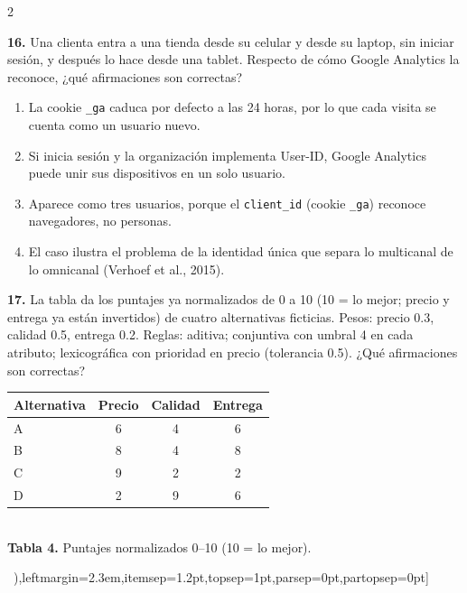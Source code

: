 \documentclass[10pt,letterpaper]{article}
\newcommand{\cas}{\framebox[1.0em]{\rule{0pt}{1.05ex}}}
\begin{document}
\begin{multicols}{2}
\begin{minipage}[t]{\columnwidth}\noindent\textbf{16.} Una clienta entra a una tienda desde su celular y desde su laptop, sin iniciar sesión, y después lo hace desde una tablet. Respecto de cómo Google Analytics la reconoce, ¿qué afirmaciones son correctas?
\vspace{1pt}\begin{enumerate}[label=\cas\ \alph*),leftmargin=2.3em,itemsep=1.2pt,topsep=1pt,parsep=0pt,partopsep=0pt]
\item La cookie \texttt{\_ga} caduca por defecto a las 24 horas, por lo que cada visita se cuenta como un usuario nuevo.
\item Si inicia sesión y la organización implementa User-ID, Google Analytics puede unir sus dispositivos en un solo usuario.
\item Aparece como tres usuarios, porque el \texttt{client\_id} (cookie \texttt{\_ga}) reconoce navegadores, no personas.
\item El caso ilustra el problema de la identidad única que separa lo multicanal de lo omnicanal (Verhoef et al., 2015).
\end{enumerate}\end{minipage}\par\vspace{3pt}
\begin{minipage}[t]{\columnwidth}\noindent\textbf{17.} La tabla da los puntajes ya normalizados de 0 a 10 (10 = lo mejor; precio y entrega ya están invertidos) de cuatro alternativas ficticias. Pesos: precio 0.3, calidad 0.5, entrega 0.2. Reglas: aditiva; conjuntiva con umbral 4 en cada atributo; lexicográfica con prioridad en precio (tolerancia 0.5). ¿Qué afirmaciones son correctas?
\begin{center}{\scriptsize\renewcommand{\arraystretch}{1.05}\begin{tabular}{@{}lccc@{}}\toprule
Alternativa & Precio & Calidad & Entrega\\\midrule
A & 6 & 4 & 6\\ B & 8 & 4 & 8\\ C & 9 & 2 & 2\\ D & 2 & 9 & 6\\\bottomrule\end{tabular}}\\[1pt]{\tiny\textbf{Tabla 4.} Puntajes normalizados 0--10 (10 = lo mejor).}\end{center}
\vspace{1pt}\begin{enumerate}[label=\cas\ \alph*),leftmargin=2.3em,itemsep=1.2pt,topsep=1pt,parsep=0pt,partopsep=0pt]

\end{enumerate}
\end{minipage}
\end{multicols}
\end{document}
